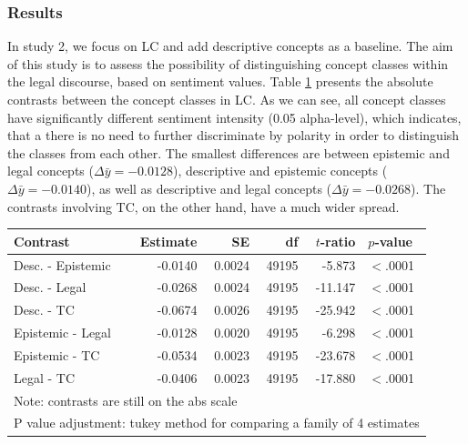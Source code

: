 \documentclass{article}
\begin{document}

\subsubsection{Results}

In study 2, we focus on LC and add descriptive concepts as a baseline. The aim of this study is to assess the possibility of distinguishing concept classes within the legal discourse, based on sentiment values. Table \ref{tab:s2m1} presents the absolute contrasts between the concept classes in LC. As we can see, all concept classes have significantly different sentiment intensity (0.05 alpha-level), which indicates, that a there is no need to further discriminate by polarity in order to distinguish the classes from each other. The smallest differences are between epistemic and legal concepts ($\Delta\bar{y}=-0.0128$), descriptive and epistemic concepts ($\Delta\bar{y}=-0.0140$), as well as descriptive and legal concepts ($\Delta\bar{y}=-0.0268$). The contrasts involving TC, on the other hand, have a much wider spread. %

\begin{table}[ht]
\centering
\begin{tabular}{lrrrrl}
  \hline
Contrast & Estimate & SE & df & $t$-ratio & $p$-value \\ 
  \hline
\rowcolor{gray!25}Desc. - Epistemic & -0.0140 & 0.0024 & 49195 & -5.873 & $<$.0001 \\ 
  Desc. - Legal & -0.0268 & 0.0024 & 49195 & -11.147 & $<$.0001 \\ 
 \rowcolor{gray!25} Desc. - TC & -0.0674 & 0.0026 & 49195 & -25.942 & $<$.0001 \\ 
  Epistemic - Legal & -0.0128 & 0.0020 & 49195 & -6.298 & $<$.0001 \\ 
 \rowcolor{gray!25} Epistemic - TC & -0.0534 & 0.0023 & 49195 & -23.678 & $<$.0001 \\ 
  Legal - TC & -0.0406 & 0.0023 & 49195 & -17.880 & $<$.0001 \\ 
   \hline
\multicolumn{6}{l}{{\footnotesize Note: contrasts are still on the abs scale}}\\

\multicolumn{6}{l}{{\footnotesize P value adjustment: tukey method for comparing a family of 4 estimates}}\\
\end{tabular}
\label{tab:s2m1}
\end{table}
\end{document}
